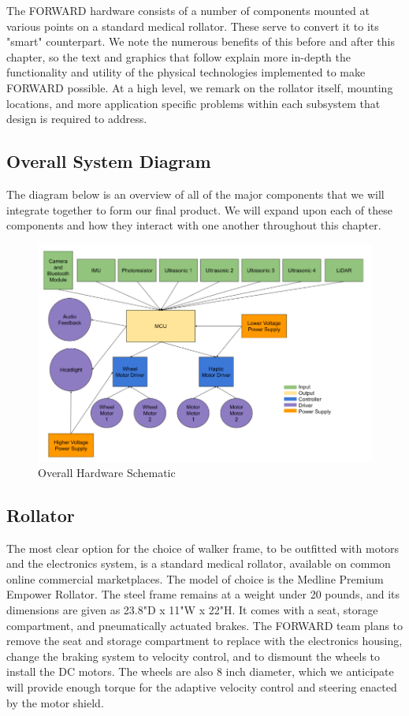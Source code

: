 \noindent The FORWARD hardware consists of a number of components mounted at various points on a standard medical rollator. These serve to convert it to its "smart" counterpart. We note the numerous benefits of this before and after this chapter, so the text and graphics that follow explain more in-depth the functionality and utility of the physical technologies implemented to make FORWARD possible. At a high level, we remark on the rollator itself, mounting locations, and more application specific problems within each subsystem that design is required to address.\\

\subsection{Overall System Diagram}
\noindent The diagram below is an overview of all of the major components that we will integrate together to form our final product. We will expand upon each of these components and how they interact with one another throughout this chapter.\\

\begin{figure}[H]
	\centering
	\includegraphics[width=1\textwidth]{./Images/overall.png}
	\caption{\label{fig:overall}Overall Hardware Schematic}
\end{figure}

\subsection{Rollator}
\noindent The most clear option for the choice of walker frame, to be outfitted with motors and the electronics system, is a standard medical rollator, available on common online commercial marketplaces. The model of choice is the Medline Premium Empower Rollator. The steel frame remains at a weight under 20 pounds, and its dimensions are given as 23.8"D x 11"W x 22"H. It comes with a seat, storage compartment, and pneumatically actuated brakes. The FORWARD team plans to remove the seat and storage compartment to replace with the electronics housing, change the braking system to velocity control, and to dismount the wheels to install the DC motors. The wheels are also 8 inch diameter, which we anticipate will provide enough torque for the adaptive velocity control and steering enacted by the motor shield.\\

